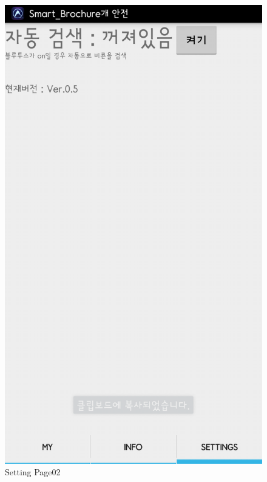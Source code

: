 \documentclass[conference]{IEEEtran}
\begin{document}
\begin{figure}[htbp]
\begin{center}
    \includegraphics[scale=0.2]{img_capture10}
    \caption{Setting Page02} 
\end{center}
\end{figure}
\end{document}

